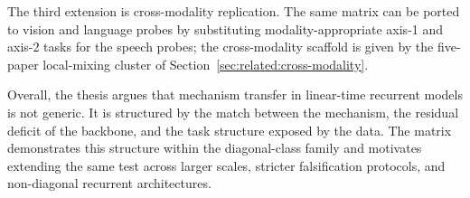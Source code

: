 The third extension is cross-modality replication. The same
matrix can be ported to vision and language probes by
substituting modality-appropriate axis-1 and axis-2 tasks for
the speech probes; the cross-modality scaffold is given by the
five-paper local-mixing cluster of
Section~\ref{sec:related:cross-modality}.

Overall, the thesis argues that mechanism transfer in linear-time
recurrent models is not generic. It is structured by the match
between the mechanism, the residual deficit of the backbone, and
the task structure exposed by the data. The matrix demonstrates
this structure within the diagonal-class family and motivates
extending the same test across larger scales, stricter
falsification protocols, and non-diagonal recurrent
architectures.
